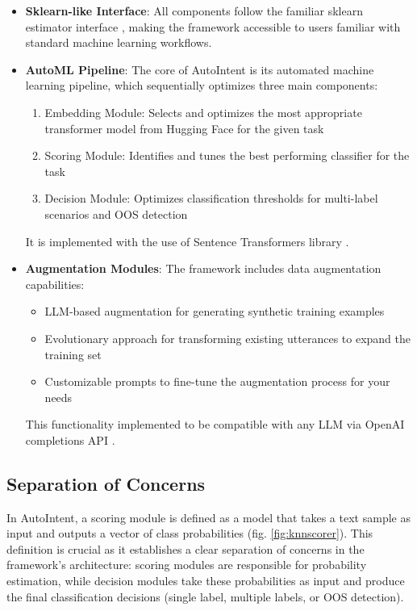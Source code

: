 \begin{itemize}
    \item \textbf{Sklearn-like Interface}: All components follow the familiar sklearn estimator interface \cite{pedregosa2018scikitlearnmachinelearningpython}, making the framework accessible to users familiar with standard machine learning workflows.
    
    \item \textbf{AutoML Pipeline}: The core of AutoIntent is its automated machine learning pipeline, which sequentially optimizes three main components:
    \begin{enumerate}
        \item Embedding Module: Selects and optimizes the most appropriate transformer model from Hugging Face for the given task
        \item Scoring Module: Identifies and tunes the best performing classifier for the task
        \item Decision Module: Optimizes classification thresholds for multi-label scenarios and OOS detection
    \end{enumerate}
    It is implemented with the use of Sentence Transformers library \cite{reimers-2019-sentence-bert}.
    
    \item \textbf{Augmentation Modules}: The framework includes data augmentation capabilities:
    \begin{itemize}
        \item LLM-based augmentation for generating synthetic training examples
        \item Evolutionary approach for transforming existing utterances to expand the training set
        \item Customizable prompts to fine-tune the augmentation process for your needs
    \end{itemize}
    This functionality implemented to be compatible with any LLM via OpenAI completions API \cite{openai_api}.
\end{itemize}

\subsection{Separation of Concerns}

In AutoIntent, a scoring module is defined as a model that takes a text sample as input and outputs a vector of class probabilities (fig. \ref{fig:knnscorer}). This definition is crucial as it establishes a clear separation of concerns in the framework's architecture: scoring modules are responsible for probability estimation, while decision modules take these probabilities as input and produce the final classification decisions (single label, multiple labels, or OOS detection).

